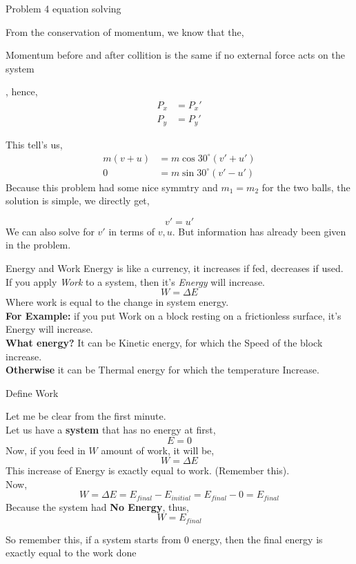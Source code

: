 \documentclass[9pt,serif]{beamer}
\newcommand{\id}[1]{ \begin{idea} #1 \end{idea} }
\begin{document}
\begin{frame}
    {Problem 4 equation solving}    
    \begin{small}    From the conservation of momentum, we know that the, 
    \id{Momentum before and after collition is the same if no external force acts on the system     }, hence, 
    \begin{align*}
        P_x &= P_x' \\
        P_y &= P_y '    
    \end{align*}

    This tell's us, 
    \begin{align*}
        m\left( v + u \right)  &= m \cos 30^{\circ} \left( v' + u' \right) \\
        0 &= m \sin 30^{\circ} \left( v' - u' \right)  
    \end{align*}
Because this problem had some nice symmtry and $m_1 = m_2$ for the two balls, the solution is simple, we directly get, 
   
\[ \boxed{v' = u'} \]
    We can also solve for $v'$ in terms of $v, u$. But information has already been given in the problem.
\end{small}
\end{frame}

%
%
%
%
%
%

\begin{frame}
    {Energy and Work}
            Energy is like a currency, it increases if fed, decreases if used. \\
        If you apply \emph{Work} to a system, then it's \emph{Energy} will increase. 
        \[ W = \Delta E \]
        Where work is equal to the change in system energy. \\
        \textbf{For Example:} if you put Work on a block resting on a frictionless surface, it's Energy will increase. \\
        \textbf{What energy?} It can be Kinetic energy, for which the Speed of the block increase. \\
        \textbf{Otherwise} it can be Thermal energy for which the temperature Increase. 
\end{frame}

%
%
%
%
\begin{frame}
    {Define Work}
    \begin{small}    Let me be clear from the first minute. \\
    Let us have a \textbf{system} that has no energy at first, 
    \[ E =0 \]
    Now, if you feed in $W$ amount of work, it will be, 
    \[ W = \Delta E \]
    This increase of Energy is exactly equal to work. (Remember this). \\
    Now, 
    \[ W = \Delta E = E_{final} - E_{initial} = E_{final} - 0 = E_{final} \]
    Because the system had \textbf{No Energy}, thus, 
    \[ W = E_{final} \] \end{small}
    \id{So remember this, if a system starts from 0 energy, then the final energy is exactly equal to the work done}
        
\end{frame}
%
\end{document}
